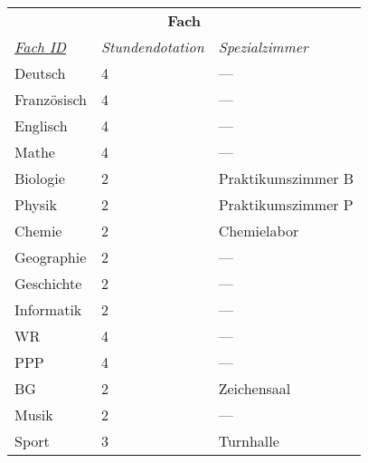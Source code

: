 \documentclass{standalone}
\begin{document}
\begin{tabular}{|l|l|l|}
    \hline
    \multicolumn{3}{|c|}{\cellcolor[HTML]{C0C0C0} \textbf{Fach}} \\
    \textit{\underline{Fach ID}}&
    \textit{Stundendotation}&
    \textit{Spezialzimmer} \\ \hline
    Deutsch&4&---\\
    Französisch&4&---\\
    Englisch&4&---\\
    Mathe&4&---\\
    Biologie&2&Praktikumszimmer B\\
    Physik&2&Praktikumszimmer P\\
    Chemie&2&Chemielabor\\
    Geographie&2&---\\
    Geschichte&2&---\\
    Informatik&2&---\\
    WR&4&---\\
    PPP&4&---\\
    BG&2&Zeichensaal\\
    Musik&2&---\\
    Sport&3&Turnhalle\\
    \hline
    \end{tabular}
\end{document}
